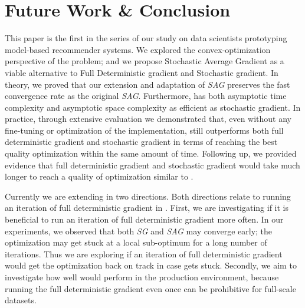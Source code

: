 \section{Future Work \& Conclusion}
This paper is the first in the series of our study on data scientists prototyping model-based recommender systems.  
We explored the convex-optimization perspective of the problem; and we propose Stochastic Average Gradient as a viable alternative to Full Deterministic gradient and Stochastic gradient.  
In theory, we proved that our extension and adaptation of \emph{SAG} preserves the fast convergence rate as the original \emph{SAG}.  
Furthermore, \tool has both asymptotic time complexity and asymptotic space complexity as efficient as stochastic gradient.  
In practice, through extensive evaluation we demonstrated that, even without any fine-tuning or optimization of the implementation, 
\tool still outperforms both full deterministic gradient and stochastic gradient in terms of reaching the best quality optimization within the same amount of time.  
Following up, we provided evidence that full deterministic gradient and stochastic gradient would take much longer to reach a quality of optimization similar to \tool.

Currently we are extending \tool in two directions.  Both directions relate to running an iteration of full deterministic gradient in \tool.
First, we are investigating if it is beneficial to run an iteration of full deterministic gradient more often.  
In our experiments, we observed that both \emph{SG} and \emph{SAG} may converge early; the optimization may get stuck at a local sub-optimum for a long number of iterations.  
Thus we are exploring if an iteration of full deterministic gradient would get the optimization back on track in case \tool gets stuck.
Secondly, we aim to investigate how well \tool would perform in the production environment, because running the full deterministic gradient even once can be prohibitive for full-scale datasets.

